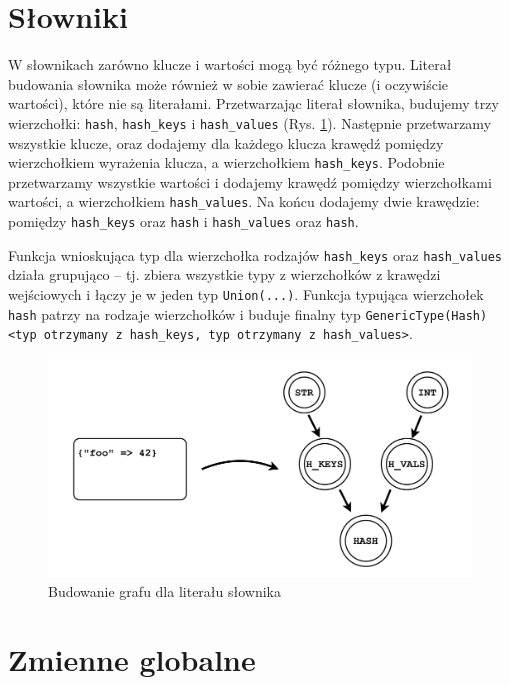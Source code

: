 \documentclass[declaration,shortabstract,mgr]{iithesis}
\begin{document}
\section{Słowniki}

W słownikach zarówno klucze i wartości mogą być różnego typu. Literał budowania słownika może również w sobie zawierać klucze (i oczywiście wartości), które nie są literałami. Przetwarzając literał słownika, budujemy trzy wierzchołki: \texttt{hash}, \texttt{hash\_keys} i \texttt{hash\_values} (Rys. \ref{fig:graph-hash}). Następnie przetwarzamy wszystkie klucze, oraz dodajemy dla każdego klucza krawędź pomiędzy wierzchołkiem wyrażenia klucza, a wierzchołkiem \texttt{hash\_keys}. Podobnie przetwarzamy wszystkie wartości i dodajemy krawędź pomiędzy wierzchołkami wartości, a wierzchołkiem \texttt{hash\_values}. Na końcu dodajemy dwie krawędzie: pomiędzy \texttt{hash\_keys} oraz \texttt{hash} i \texttt{hash\_values} oraz \texttt{hash}.

Funkcja wnioskująca typ dla wierzchołka rodzajów \texttt{hash\_keys} oraz \texttt{hash\_values} działa grupująco -- tj. zbiera wszystkie typy z wierzchołków z krawędzi wejściowych i łączy je w jeden typ \texttt{Union(...)}.
Funkcja typująca wierzchołek \texttt{hash} patrzy na rodzaje wierzchołków i buduje finalny typ \texttt{GenericType(Hash)<typ otrzymany z hash\_keys, typ otrzymany z hash\_values>}.


\begin{figure}[htb]
	\centering
	\includegraphics[scale=0.4]{imgs/hash.png}
	\caption{Budowanie grafu dla literału słownika}
	\label{fig:graph-hash}
\end{figure}

\section{Zmienne globalne}
\end{document}
